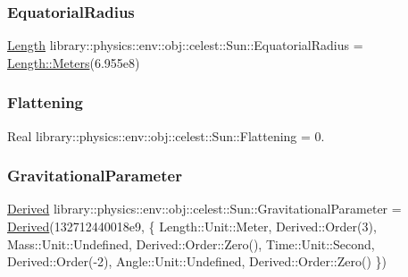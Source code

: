 \subsubsection{\texorpdfstring{Equatorial\+Radius}{EquatorialRadius}}
{\footnotesize\ttfamily \hyperlink{classlibrary_1_1physics_1_1units_1_1_length}{Length} library\+::physics\+::env\+::obj\+::celest\+::\+Sun\+::\+Equatorial\+Radius = \hyperlink{classlibrary_1_1physics_1_1units_1_1_length_ad523a3737d5c3f23a64588eac83f2148}{Length\+::\+Meters}(6.\+955e8)\hspace{0.3cm}{\ttfamily [static]}}

\mbox{\label{classlibrary_1_1physics_1_1env_1_1obj_1_1celest_1_1_sun_a48caf436831d176c692b6aa714b77676}} 
\subsubsection{\texorpdfstring{Flattening}{Flattening}}
{\footnotesize\ttfamily Real library\+::physics\+::env\+::obj\+::celest\+::\+Sun\+::\+Flattening = 0.\hspace{0.3cm}{\ttfamily [static]}}

\mbox{\label{classlibrary_1_1physics_1_1env_1_1obj_1_1celest_1_1_sun_abdaf89ab0651e1cd00701de41f728427}} 
\subsubsection{\texorpdfstring{Gravitational\+Parameter}{GravitationalParameter}}
{\footnotesize\ttfamily \hyperlink{classlibrary_1_1physics_1_1units_1_1_derived}{Derived} library\+::physics\+::env\+::obj\+::celest\+::\+Sun\+::\+Gravitational\+Parameter = \hyperlink{classlibrary_1_1physics_1_1units_1_1_derived}{Derived}(132712440018e9, \{ Length\+::\+Unit\+::\+Meter, Derived\+::\+Order(3), Mass\+::\+Unit\+::\+Undefined, Derived\+::\+Order\+::\+Zero(), Time\+::\+Unit\+::\+Second, Derived\+::\+Order(-\/2), Angle\+::\+Unit\+::\+Undefined, Derived\+::\+Order\+::\+Zero() \})\hspace{0.3cm}{\ttfamily [static]}}



